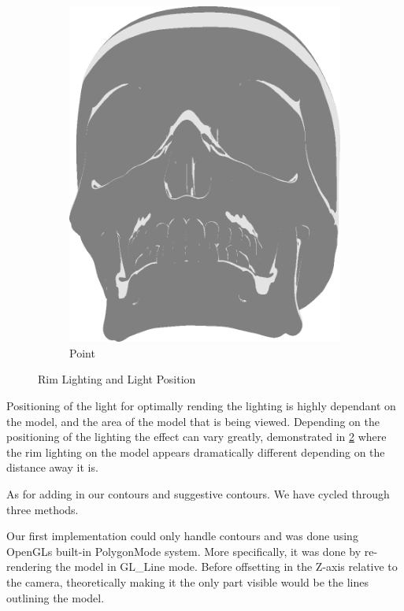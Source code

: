 \begin{figure}[h]
\begin{subfigure}[b]{0.18\textwidth}
        \includegraphics[width=\textwidth]{img/Lighting/Point.png}
        \caption{Point}
        \label{fig:LightingPosPos}
    \end{subfigure}
\caption{Rim Lighting and Light Position}
 \label{fig:LightingPosRim}
 \end{figure}

Positioning of the light for optimally rending the lighting is highly dependant on the model, and the area of the model that is being viewed. Depending on the positioning of the lighting the effect can vary greatly, demonstrated in \ref{fig:LightingPosRim} where the rim lighting on the model appears dramatically different depending on the distance away it is.

As for adding in our contours and suggestive contours. We have cycled through three methods.

Our first implementation could only handle contours and was done using OpenGLs built-in PolygonMode system. More specifically, it was done by re-rendering the model in GL_Line mode. Before offsetting in the Z-axis relative to the camera, theoretically making it the only part visible would be the lines outlining the model.

